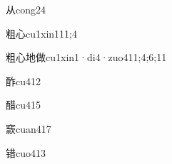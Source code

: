 \begin{verbete}{从}{cong2}{4}
\end{verbete}
\begin{verbete}{粗心}{cu1xin1}{11;4}
\end{verbete}
\begin{verbete}{粗心地做}{cu1xin1·di4·zuo4}{11;4;6;11}
\end{verbete}
\begin{verbete}{酢}{cu4}{12}
\end{verbete}
\begin{verbete}{醋}{cu4}{15}
\end{verbete}
\begin{verbete}{窾}{cuan4}{17}
\end{verbete}
\begin{verbete}{错}{cuo4}{13}
\end{verbete}

